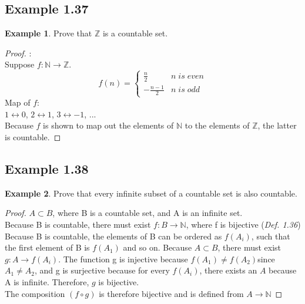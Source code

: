 \documentclass[openany, amssymb, psamsfonts]{amsart}
\newcommand{\bbN}{\mathbb{N}}
\newcommand{\bbZ}{\mathbb{Z}}
\theoremstyle{definition}
\newtheorem{exmp}{Example}[section]
\numberwithin{equation}{section}
\begin{document}
\subsection{Example 1.37}
\begin{exmp}
    Prove that $\bbZ$ is a countable set.
\end{exmp}
\begin{proof}:\\
    Suppose $f\colon \bbN \rightarrow \bbZ$. \\
\[ f(n) = \begin{cases} 
          \frac{n}{2} & n\; is\; even\\
          -\frac{n-1}{2} & n\; is\; odd
       \end{cases}\]
Map of $f$:\\

$1\leftrightarrow 0$, $2\leftrightarrow 1$, $3\leftrightarrow -1$, ...\\

Because $f$ is shown to map out the elements of $\mathbb{N}$ to the elements of $\mathbb{Z}$, the latter is countable.
\end{proof}
\subsection{Example 1.38}
\label{1.38}
\begin{exmp}
    Prove that every infinite subset of a countable set is also countable.
\end{exmp}
\begin{proof}
    $A\subset B$, where B is a countable set, and  A is an infinite set.\\
Because B is countable, there must exist $f\colon B \rightarrow \bbN$, where f is bijective (\emph{Def. 1.36})
Because B is countable, the elements of B can be ordered as $f(A_i)$, such that the first element of B is $f(A_1)$ and so on. Because $A\subset B$, there must exist $g\colon A\rightarrow f(A_i)$. The function g is injective because $f(A_1)\neq f(A_2) $since$ A_1 \neq A_2$, and g is surjective because for every $f(A_i)$, there exists an $A$ because A is infinite. Therefore, $g$ is bijective. \\ 
The composition $(f\circ g)$ is therefore bijective and is defined from $A\longrightarrow \bbN$
\end{proof}
\end{document}
